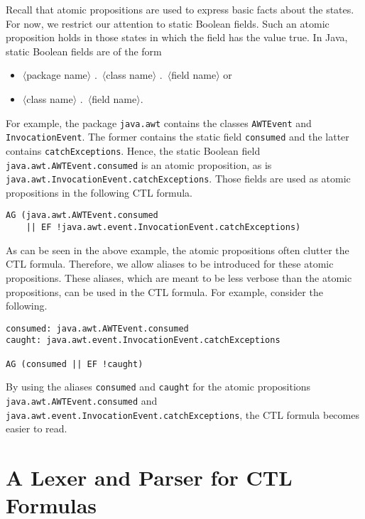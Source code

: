 \documentclass[12pt]{article}
\theoremstyle{definition}
\begin{document}
Recall that atomic propositions are used to express basic facts about the states.  For now, we restrict our attention to static Boolean fields.  Such an atomic proposition holds in those states in which the field has the value true.  In Java, static Boolean fields are of the form 
\begin{itemize}
\item 
$\langle$package name$\rangle$ .\ $\langle$class name$\rangle$ .\ $\langle$field name$\rangle$ or
\item
$\langle$class name$\rangle$ .\ $\langle$field name$\rangle$.
\end{itemize}
For example, the package \lstinline{java.awt} contains the classes \lstinline{AWTEvent} and \lstinline{InvocationEvent}.  The former contains the static field \lstinline{consumed} and the latter contains \lstinline{catchExceptions}.  Hence, the static Boolean field \lstinline{java.awt.AWTEvent.consumed} is an atomic proposition, as is \lstinline{java.awt.InvocationEvent.catchExceptions}.  Those fields are used as atomic propositions in the following CTL formula.
\begin{lstlisting}
AG (java.awt.AWTEvent.consumed 
    || EF !java.awt.event.InvocationEvent.catchExceptions)
\end{lstlisting}

As can be seen in the above example, the atomic propositions often clutter the CTL formula.  Therefore, we allow  aliases to be introduced for these atomic propositions.  These aliases, which are meant to be less verbose than the atomic propositions, can be used in the CTL formula.  For example, consider the following.
\begin{lstlisting}
consumed: java.awt.AWTEvent.consumed
caught: java.awt.event.InvocationEvent.catchExceptions

AG (consumed || EF !caught)
\end{lstlisting}
By using the aliases \lstinline{consumed} and \lstinline{caught} for the atomic propositions \lstinline{java.awt.AWTEvent.consumed} and \lstinline{java.awt.event.InvocationEvent.catchExceptions}, the CTL formula becomes easier to read.

\section{A Lexer and Parser for CTL Formulas}
\end{document}
